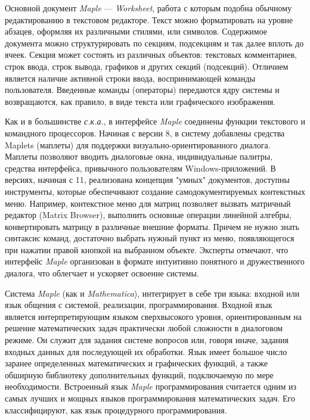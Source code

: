 Основной документ \textit{Maple} --- \textit{Worksheet}, работа с которым подобна обычному редактированию в текстовом редакторе. Текст можно форматировать на уровне абзацев, оформляя их различными стилями, или символов. Содержимое документа можно структурировать по секциям, подсекциям и так далее вплоть до ячеек. Секция может состоять из различных объектов: текстовых комментариев, строк ввода, строк вывода, графиков и других секций (подсекций). Отличием является наличие активной строки ввода, воспринимающей команды пользователя. Введенные команды (операторы) передаются ядру системы и возвращаются, как правило, в виде текста или графического изображения. 

Как и в большинстве \textit{с.к.а.}, в интерфейсе \textit{Maple} соединены функции текстового и командного процессоров. Начиная с версии 8, в систему добавлены средства Maplets (маплеты) для поддержки визуально-ориентированного диалога. Маплеты позволяют вводить диалоговые окна, индивидуальные палитры, средства интерфейса, привычного пользователям Windows-приложений. В версиях, начиная с 11, реализована концепция "умных"{} документов, доступны инструменты, которые обеспечивают создание самодокументируемых контекстных меню. Например, контекстное меню для матриц позволяет вызвать матричный редактор (Matrix Browser), выполнить основные операции линейной алгебры, конвертировать матрицу в различные внешние форматы. Причем не нужно знать синтаксис команд, достаточно выбрать нужный пункт из меню, появляющегося при нажатии правой кнопкой на выбранном объекте. Эксперты отмечают, что интерфейс \textit{Maple} организован в формате интуитивно понятного и дружественного диалога, что облегчает и ускоряет освоение системы.

Система \textit{Maple} (как и \textit{Mathematica}), интегрирует в себе три языка: входной или язык общения с системой, реализации, программирования.
Входной язык является интерпретирующим языком сверхвысокого уровня, ориентированным на решение математических задач практически любой сложности в диалоговом режиме. Он служит для задания системе вопросов или, говоря иначе, задания входных данных для последующей их обработки. Язык имеет большое число заранее определенных математических и графических функций, а также обширную библиотеку дополнительных функций, подключаемую по мере необходимости. Встроенный язык \textit{Maple} программирования считается одним из самых лучших и мощных языков программирования математических задач. Его классифицируют, как язык процедурного программирования.

